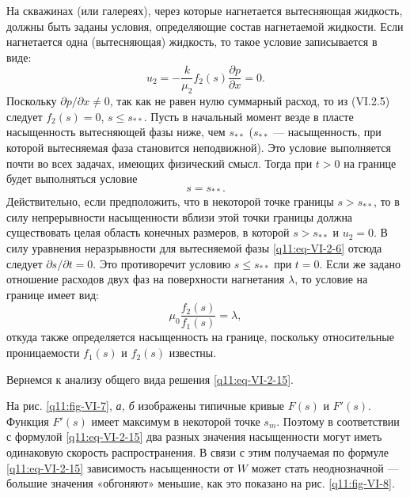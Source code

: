 На скважинах (или галереях), через которые нагнетается вытесняющая жидкость, должны быть заданы условия, определяющие состав нагнетаемой жидкости. Если нагнетается одна (вытесняющая) жидкость, то такое условие записывается в виде:
\begin{equation}u_2=-\frac{k}{\mu_2}f_2(s)\frac{\partial p}{\partial x}=0.\tag{VI.2.16}\label{q11:eq-VI-2-16}\end{equation}
Поскольку $\partial p/\partial x\ne0$, так как не равен нулю суммарный расход, то из (VI.2.5) следует $f_2(s)=0$, $s\le s_{**}$. Пусть в начальный момент везде в пласте насыщенность вытесняющей фазы ниже, чем $s_{**}$ ($s_{**}$ --- насыщенность, при которой вытесняемая фаза становится неподвижной). Это условие выполняется почти во всех задачах, имеющих физический смысл. Тогда при $t>0$ на границе будет выполняться условие
\begin{equation}s=s_{**}.\tag{VI.2.17}\label{q11:eq-VI-2-17}\end{equation}
Действительно, если предположить, что в некоторой точке границы $s>s_{**}$, то в силу непрерывности насыщенности вблизи этой точки границы должна существовать целая область конечных размеров, в которой $s>s_{**}$ и $u_2=0$. В силу уравнения неразрывности для вытесняемой фазы \eqref{q11:eq-VI-2-6} отсюда следует $\partial s/\partial t=0$. Это противоречит условию $s\le s_{**}$ при $t=0$. Если же задано отношение расходов двух фаз на поверхности нагнетания $\lambda$, то условие на границе имеет вид:
\begin{equation}\mu_0\frac{f_2(s)}{f_1(s)}=\lambda,\tag{VI.2.18}\label{q11:eq-VI-2-18}\end{equation}
откуда также определяется насыщенность на границе, поскольку относительные проницаемости $f_1(s)$ и $f_2(s)$ известны.

Вернемся к анализу общего вида решения \eqref{q11:eq-VI-2-15}.

На рис. \ref{q11:fig-VI-7}, \textit{а, б} изображены типичные кривые $F(s)$ и $F'(s)$. Функция $F'(s)$ имеет максимум в некоторой точке $s_m$. Поэтому в соответствии с формулой \eqref{q11:eq-VI-2-15} два разных значения насыщенности могут иметь одинаковую скорость распространения. В связи с этим получаемая по формуле \eqref{q11:eq-VI-2-15} зависимость насыщенности от $W$
может стать неоднозначной --- большие значения «обгоняют» меньшие, как это показано на рис. \ref{q11:fig-VI-8}.

